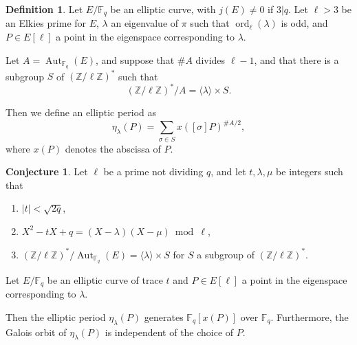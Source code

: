 \documentclass[12pt]{article}
\theoremstyle{plain}
\theoremstyle{definition}
\newtheorem{definition}[theorem]{Definition}
\newtheorem{conjecture}[theorem]{Conjecture}
\DeclareMathOperator{\order}{ord} %
\DeclareMathOperator{\Aut}{Aut}
\def\Z{\ensuremath{\mathbb{Z}}}
\def\F{\ensuremath{\mathbb{F}}}
\begin{document}
\begin{definition}
\label{definition:ellperiod}
Let $E/\F_q$ be an elliptic curve, with $j(E)\ne0$ if $3|q$.
Let $\ell > 3$ be an Elkies prime for $E$,
$\lambda$ an eigenvalue of $\pi$ such that $\order_\ell(\lambda)$ is odd,
and $P \in E[\ell]$ a point in the eigenspace corresponding
to $\lambda$.

Let $A=\Aut_{\F_q}(E)$, and suppose that $\# A$ divides $\ell - 1$,
and that there is a subgroup $S$ of $(\Z/\ell\Z)^{\ast}$ such that
\begin{equation}
(\Z/\ell\Z)^{\ast} / A = \langle{\lambda}\rangle \times S.
\end{equation}

Then we define an elliptic period as
\begin{equation}
\eta_\lambda(P) = \sum_{\sigma\in S} {x \left([\sigma] P \right)^{\# A/2}},
\end{equation}
where $x(P)$ denotes the abscissa of $P$.
\end{definition}

\begin{conjecture}
\label{conj:ellperiods}
Let $\ell$ be a prime not dividing $q$, and let $t, \lambda, \mu$ be
integers such that
\begin{enumerate}
    \item $\lvert t \rvert < \sqrt{2q}$,
    \item $X^2 - tX + q = (X - \lambda)(X - \mu)\bmod \ell$,
    \item $(\Z/\ell\Z)^{\ast}/\Aut_{\F_q}(E) = \langle{\lambda}\rangle \times S$
for $S$ a subgroup of $(\Z/\ell\Z)^{\ast}$.
\end{enumerate}

Let $E/\F_q$ be an elliptic curve of trace $t$
and $P \in E[\ell]$ a point in the eigenspace
corresponding to $\lambda$.

Then the elliptic period $\eta_\lambda(P)$ generates $\F_q[x(P)]$ over
$\F_q$.
Furthermore, the Galois orbit of $\eta_\lambda(P)$ is
independent of the choice of $P$.
\end{conjecture}
\end{document}
